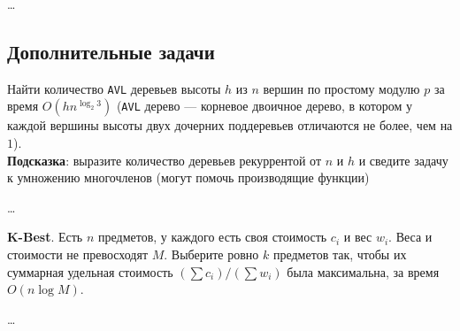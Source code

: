 \begin{solution}
    \dots
\end{solution}


\subsection*{Дополнительные задачи}

\begin{problem}
    Найти количество \texttt{AVL} деревьев высоты $h$ из $n$ вершин по простому модулю $p$ за время $O(h n^{\log_2 3})$
    (\texttt{AVL} дерево --- корневое двоичное дерево, в котором у каждой вершины высоты двух дочерних поддеревьев отличаются не более, чем на $1$).\\
    {
        \footnotesize \textbf{Подсказка}: выразите количество деревьев рекуррентой от $n$ и $h$ и сведите задачу к умножению многочленов
        (могут помочь производящие функции)
    }
\end{problem}

\begin{solution}
    \dots
\end{solution}


\begin{problem}
    \textbf{K-Best}. Есть $n$ предметов, у каждого есть своя стоимость $c_i$ и вес $w_i$. Веса и стоимости не превосходят $M$.
    Выберите ровно $k$ предметов так, чтобы их суммарная удельная стоимость $\left(\sum c_i\right) / \left(\sum w_i\right)$ была максимальна,
    за время $O(n \log M)$.
\end{problem}


\begin{solution}
    \dots
\end{solution}


\clearpage
